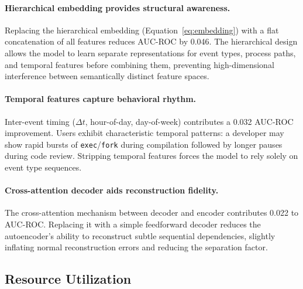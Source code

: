 \documentclass[letterpaper,twocolumn,10pt]{article}
\begin{document}
\paragraph{Hierarchical embedding provides structural awareness.}
Replacing the hierarchical embedding
(Equation~\ref{eq:embedding}) with a flat concatenation of all
features reduces AUC-ROC by 0.046.  The hierarchical design allows
the model to learn separate representations for event types,
process paths, and temporal features before combining them,
preventing high-dimensional interference between semantically
distinct feature spaces.

\paragraph{Temporal features capture behavioral rhythm.}
Inter-event timing ($\Delta t$, hour-of-day, day-of-week)
contributes a 0.032 AUC-ROC improvement.  Users exhibit
characteristic temporal patterns: a developer may show rapid bursts
of \texttt{exec}/\texttt{fork} during compilation followed by
longer pauses during code review.  Stripping temporal features
forces the model to rely solely on event type sequences.

\paragraph{Cross-attention decoder aids reconstruction fidelity.}
The cross-attention mechanism between decoder and encoder
contributes 0.022 to AUC-ROC.  Replacing it with a simple
feedforward decoder reduces the autoencoder's ability to
reconstruct subtle sequential dependencies, slightly inflating
normal reconstruction errors and reducing the separation factor.


\subsection{Resource Utilization}
\end{document}
